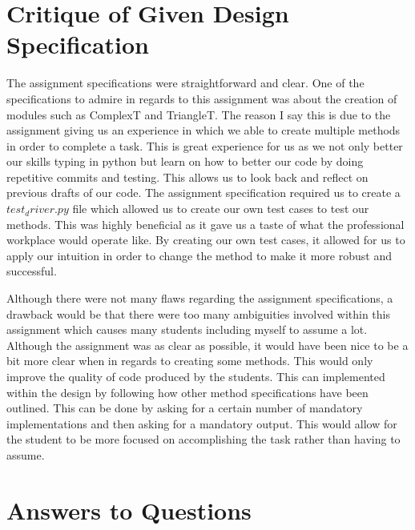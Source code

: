 \documentclass[12pt]{article}
\begin{document}
\section{Critique of Given Design Specification}

The assignment specifications were straightforward and clear. One of the specifications to admire in regards to this assignment was about the creation of
modules such as ComplexT and TriangleT. The reason I say this is due to the assignment giving us an experience in which we able to create multiple methods
in order to complete a task. This is great experience for us as we not only better our skills typing in python but learn on how to better our code by doing
repetitive commits and testing. This allows us to look back and reflect on previous drafts of our code. The assignment specification required us to create a
$test_driver.py$ file which allowed us to create our own test cases to test our methods. This was highly beneficial as it gave us a taste of what the
professional workplace would operate like. By creating our own test cases, it allowed for us to apply our intuition in order to change the method to make it
more robust and successful.

Although there were not many flaws regarding the assignment specifications, a drawback would be that there were too many ambiguities involved within this
assignment which causes many students including myself to assume a lot. Although the assignment was as clear as possible, it would have been nice to be a
bit more clear when in regards to creating some methods. This would only improve the quality of code produced by the students. This can implemented within
the design by following how other method specifications have been outlined. This can be done by asking for a certain number of mandatory implementations and
then asking for a mandatory output. This would allow for the student to be more focused on accomplishing the task rather than having to assume.

\section{Answers to Questions}
\end{document}
